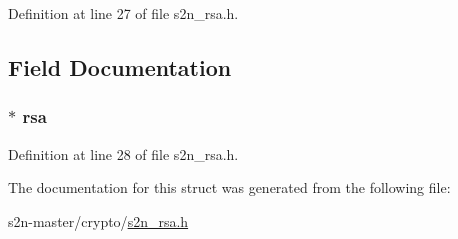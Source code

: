 Definition at line 27 of file s2n\+\_\+rsa.\+h.



\subsection{Field Documentation}
\subsubsection[{\texorpdfstring{rsa}{rsa}}]{$\ast$ rsa}\hypertarget{structs2n__rsa__public__key_abe5e4dd8049eff80d7e599d751f143f8}{}\label{structs2n__rsa__public__key_abe5e4dd8049eff80d7e599d751f143f8}


Definition at line 28 of file s2n\+\_\+rsa.\+h.



The documentation for this struct was generated from the following file\+:\begin{DoxyCompactItemize}
\item 
s2n-\/master/crypto/\hyperlink{s2n__rsa_8h}{s2n\+\_\+rsa.\+h}\end{DoxyCompactItemize}

